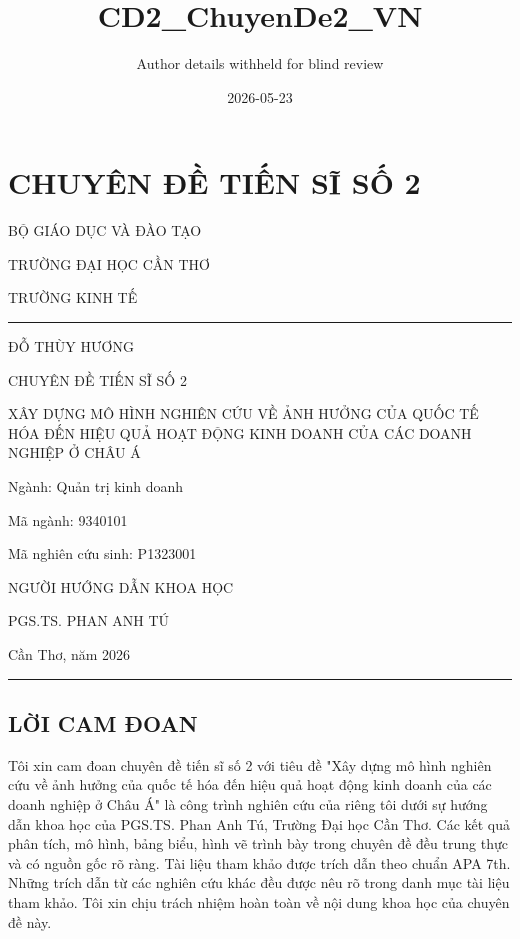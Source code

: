 \documentclass[12pt,a4paper]{article}
\title{CD2\_ChuyenDe2\_VN}
\author{Author details withheld for blind review}
\date{2026-05-23}
\begin{document}
\maketitle

\hypertarget{chuyuxean-ux111ux1ec1-tiux1ebfn-sux129-sux1ed1-2}{%
\section{CHUYÊN ĐỀ TIẾN SĨ SỐ
2}\label{chuyuxean-ux111ux1ec1-tiux1ebfn-sux129-sux1ed1-2}}

BỘ GIÁO DỤC VÀ ĐÀO TẠO

TRƯỜNG ĐẠI HỌC CẦN THƠ

TRƯỜNG KINH TẾ

\begin{center}\rule{0.5\linewidth}{0.5pt}\end{center}

ĐỖ THÙY HƯƠNG

CHUYÊN ĐỀ TIẾN SĨ SỐ 2

XÂY DỰNG MÔ HÌNH NGHIÊN CỨU VỀ ẢNH HƯỞNG CỦA QUỐC TẾ HÓA ĐẾN HIỆU QUẢ
HOẠT ĐỘNG KINH DOANH CỦA CÁC DOANH NGHIỆP Ở CHÂU Á

Ngành: Quản trị kinh doanh

Mã ngành: 9340101

Mã nghiên cứu sinh: P1323001

NGƯỜI HƯỚNG DẪN KHOA HỌC

PGS.TS. PHAN ANH TÚ

Cần Thơ, năm 2026

\begin{center}\rule{0.5\linewidth}{0.5pt}\end{center}

\hypertarget{lux1eddi-cam-ux111oan}{%
\subsection{LỜI CAM ĐOAN}\label{lux1eddi-cam-ux111oan}}

Tôi xin cam đoan chuyên đề tiến sĩ số 2 với tiêu đề "Xây dựng mô hình
nghiên cứu về ảnh hưởng của quốc tế hóa đến hiệu quả hoạt động kinh
doanh của các doanh nghiệp ở Châu Á" là công trình nghiên cứu của riêng
tôi dưới sự hướng dẫn khoa học của PGS.TS. Phan Anh Tú, Trường Đại học
Cần Thơ. Các kết quả phân tích, mô hình, bảng biểu, hình vẽ trình bày
trong chuyên đề đều trung thực và có nguồn gốc rõ ràng. Tài liệu tham
khảo được trích dẫn theo chuẩn APA 7th. Những trích dẫn từ các nghiên
cứu khác đều được nêu rõ trong danh mục tài liệu tham khảo. Tôi xin chịu
trách nhiệm hoàn toàn về nội dung khoa học của chuyên đề này.
\end{document}
